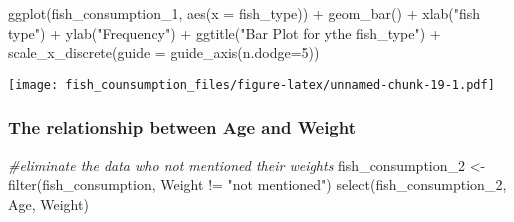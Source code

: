 \documentclass[
]{article}
\newenvironment{Shaded}{\begin{snugshade}}{\end{snugshade}}
\newcommand{\AttributeTok}[1]{\textcolor[rgb]{0.77,0.63,0.00}{#1}}
\newcommand{\CommentTok}[1]{\textcolor[rgb]{0.56,0.35,0.01}{\textit{#1}}}
\newcommand{\DecValTok}[1]{\textcolor[rgb]{0.00,0.00,0.81}{#1}}
\newcommand{\FunctionTok}[1]{\textcolor[rgb]{0.00,0.00,0.00}{#1}}
\newcommand{\NormalTok}[1]{#1}
\newcommand{\OtherTok}[1]{\textcolor[rgb]{0.56,0.35,0.01}{#1}}
\newcommand{\SpecialCharTok}[1]{\textcolor[rgb]{0.00,0.00,0.00}{#1}}
\newcommand{\StringTok}[1]{\textcolor[rgb]{0.31,0.60,0.02}{#1}}
\begin{document}
\begin{Shaded}
\begin{Highlighting}[]
\FunctionTok{ggplot}\NormalTok{(fish\_consumption\_1, }\FunctionTok{aes}\NormalTok{(}\AttributeTok{x =}\NormalTok{ fish\_type)) }\SpecialCharTok{+}
  \FunctionTok{geom\_bar}\NormalTok{() }\SpecialCharTok{+}
  \FunctionTok{xlab}\NormalTok{(}\StringTok{"fish type"}\NormalTok{) }\SpecialCharTok{+}
  \FunctionTok{ylab}\NormalTok{(}\StringTok{"Frequency"}\NormalTok{) }\SpecialCharTok{+}
  \FunctionTok{ggtitle}\NormalTok{(}\StringTok{"Bar Plot for ythe fish\_type"}\NormalTok{) }\SpecialCharTok{+} \FunctionTok{scale\_x\_discrete}\NormalTok{(}\AttributeTok{guide =} \FunctionTok{guide\_axis}\NormalTok{(}\AttributeTok{n.dodge=}\DecValTok{5}\NormalTok{))}
\end{Highlighting}
\end{Shaded}

\texttt{[image: fish\_counsumption\_files/figure-latex/unnamed-chunk-19-1.pdf]}

\hypertarget{the-relationship-between-age-and-weight}{%
\subsubsection{The relationship between Age and
Weight}\label{the-relationship-between-age-and-weight}}

\begin{Shaded}
\begin{Highlighting}[]
\CommentTok{\#eliminate the data who not mentioned their weights}
\NormalTok{fish\_consumption\_2 }\OtherTok{\textless{}{-}} \FunctionTok{filter}\NormalTok{(fish\_consumption, Weight }\SpecialCharTok{!=} \StringTok{"not mentioned"}\NormalTok{)}
                         \FunctionTok{select}\NormalTok{(fish\_consumption\_2, Age, Weight)}
\end{Highlighting}
\end{Shaded}
\end{document}
